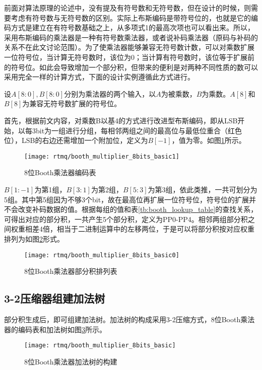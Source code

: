 前面对算法原理的论述中，没有提及有符号数和无符号数，但在设计的时候，则需要考虑有符号数与无符号数的区别。实际上布斯编码是带符号位的，也就是它的编码方式是建立在有符号数基础之上，从多项式1的最高次项也可以看出来。所以，采用布斯编码的乘法器是一种有符号数乘法器，或者说补码乘法器（原码与补码的关系不在此文讨论范围）。为了使乘法器能够兼容无符号数计数，可以对乘数扩展一位符号位，当计算无符号数时，该位为0；当计算有符号数时，该位等于扩展前的符号位。如此会导致增加一个部分积，但带来的便利是对两种不同性质的数可以采用完全一样的计算方式，下面的设计实例遵循此方式进行。

设$A[8:0], B[8:0]$分别为乘法器的两个输入，以$A$为被乘数，$B$为乘数。$A[8]$和$B[8]$为兼容无符号数扩展的符号位。

首先，根据前文内容，对乘数B以基4的方式进行改进型布斯编码，即从LSB开始，以每3bit为一组进行分组，每相邻两组之间的最高位与最低位重合（红色位），LSB的右边还需增加一个附加位，定义为$B[-1]$，值为零。如图\ref{fig:booth_multiplier_8bits_basic1}所示。

\begin{figure}
    \centering
    \caption[8位Booth乘法器编码表]{8位Booth乘法器编码表\label{fig:booth_multiplier_8bits_basic1}}
    \texttt{[image: rtmq/booth\_multiplier\_8bits\_basic1]}
\end{figure}


$B[1:-1]$为第1组，$B[3:1]$为第2组，$B[5:3]$为第3组，依此类推，一共可划分为5组。其中第5组因为不够3个bit，故在最高位再扩展一位符号位，符号位的扩展并不会改变补码数据的值。根据每组的值和表\ref{tb:booth_lookup_table}的查找关系，可得出对应的部分积，一共产生5个部分积，定义为PP0-PP4。相邻两组部分积之间权重相差4倍，相当于二进制运算中的左移两位，于是可以将部分积按对应权重排列为如图\ref{fig:booth_multiplier_8bits_basic0}形式。
\begin{figure}
    \centering
    \caption[8位Booth乘法器部分积排列表]{8位Booth乘法器部分积排列表\label{fig:booth_multiplier_8bits_basic0}}
    \texttt{[image: rtmq/booth\_multiplier\_8bits\_basic0]}
\end{figure}

\subsection[3-2压缩器组建加法树]{3-2压缩器组建加法树}
部分积生成后，即可组建加法树。加法树的构成采用3-2压缩方式，8位Booth乘法器的编码表和加法树如图\ref{fig:booth_multiplier_8bits_basic}所示。

\begin{figure}
    \centering
    \caption[8位Booth乘法器加法树的构建]{8位Booth乘法器加法树的构建\label{fig:booth_multiplier_8bits_basic}}
    \texttt{[image: rtmq/booth\_multiplier\_8bits\_basic]}
\end{figure}

